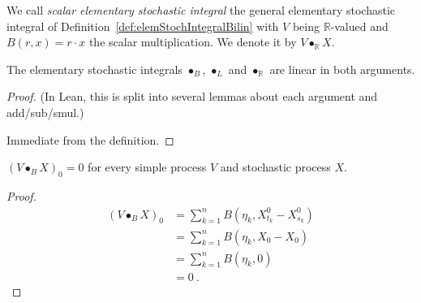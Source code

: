 \begin{definition}\label{def:elemStochIntegral}
We call \emph{scalar elementary stochastic integral} the general elementary stochastic integral of Definition~\ref{def:elemStochIntegralBilin} with $V$ being $\mathbb{R}$-valued and $B(r, x) = r \cdot x$ the scalar multiplication.
We denote it by $V \bullet_{\mathbb{R}} X$.
\end{definition}


\begin{lemma}\label{lem:elemStochIntegral_linear}
The elementary stochastic integrals $\bullet_B$, $\bullet_L$ and $\bullet_{\mathbb{R}}$ are linear in both arguments.
\end{lemma}

\begin{proof}
(In Lean, this is split into several lemmas about each argument and add/sub/smul.)

Immediate from the definition.
\end{proof}


\begin{lemma}\label{lem:elemStochIntegralBilin_zero}
  \leanok
$(V \bullet_B X)_0 = 0$ for every simple process $V$ and stochastic process $X$.
\end{lemma}

\begin{proof}
  \leanok
\begin{align*}
  (V \bullet_B X)_0
  &= \sum_{k=1}^{n} B (\eta_k, X^0_{t_k} - X^0_{s_k})
  \\
  &= \sum_{k=1}^{n} B (\eta_k, X_{0} - X_{0})
  \\
  &= \sum_{k=1}^{n} B (\eta_k, 0)
  \\
  &= 0
  \: .
\end{align*}
\end{proof}


